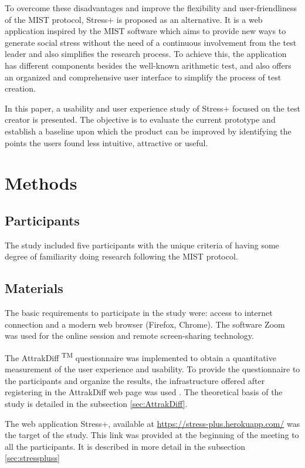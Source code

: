 \documentclass[conference]{IEEEtran}
\begin{document}
To overcome these disadvantages and improve the flexibility and
user-friendliness of the MIST protocol, Stress+ is proposed as an alternative.
It is a web application inspired by the MIST software which aims to provide new
ways to generate social stress without the need of a continuous involvement from
the test leader and also simplifies the research process. To achieve this, the
application has different components besides the well-known arithmetic test, and
also offers an organized and comprehensive user interface to simplify the
process of test creation.


In this paper, a usability and user experience study of Stress+ focused on the
test creator is presented. The objective is to evaluate the current prototype
and establish a baseline upon which the product can be improved by identifying
the points the users found less intuitive, attractive or useful.
\section{Methods}
\label{sec:org99747b3}
\subsection{Participants}
\label{sec:org7b16fd5}
The study included five participants with the unique criteria of having some
degree of familiarity doing research following the MIST protocol.

\subsection{Materials}
\label{sec:org547e513}

The basic requirements to participate in the study were: access to internet
connection and a modern web browser (Firefox, Chrome). The software Zoom \cite{noauthor_zoom_nodate} was used for the online session and
remote screen-sharing technology.

The AttrakDiff \textsuperscript{TM} questionnaire
\cite{noauthor_AttrakDiff_nodate} was implemented to obtain a quantitative measurement of
the user experience and usability. To provide the questionnaire to the
participants and organize the results, the infrastructure offered after
registering in the AttrakDiff web page was used \cite{noauthor_esurvey_nodate}.
The theoretical basis of the study is detailed in the subsection \ref{sec:AttrakDiff}.

The web application Stress+, available at \url{https://stress-plus.herokuapp.com/} was
the target of the study. This link was provided at the beginning of the meeting
to all the participants. It is described in more detail in the subsection
\ref{sec:stresspluss}
\end{document}
